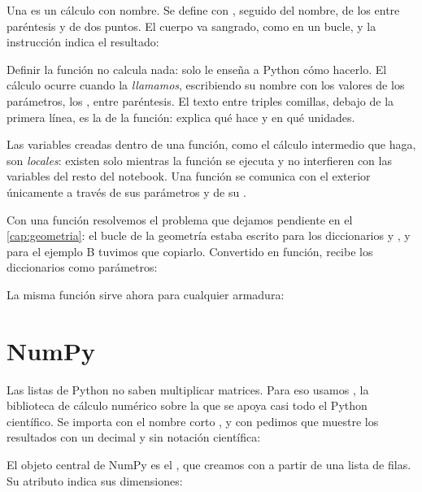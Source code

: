 Una  es un cálculo con nombre. Se define con
, seguido del nombre, de los  entre
paréntesis y de dos puntos. El cuerpo va sangrado, como en un bucle, y la
instrucción  indica el resultado:

Definir la función no calcula nada: solo le enseña a Python cómo hacerlo. El
cálculo ocurre cuando la \emph{llamamos}, escribiendo su nombre con los
valores de los parámetros, los , entre
paréntesis. El texto entre triples comillas, debajo de la primera línea, es
la  de la función: explica qué hace y en
qué unidades.

\begin{python}
Las variables creadas dentro de una función, como el cálculo intermedio que
haga, son \emph{locales}: existen solo mientras la función se ejecuta y no
interfieren con las variables del resto del notebook. Una función se comunica
con el exterior únicamente a través de sus parámetros y de su .
\end{python}

Con una función resolvemos el problema que dejamos pendiente en el
\cref{cap:geometria}: el bucle de la geometría estaba escrito para los
diccionarios  y , y para el ejemplo B tuvimos que
copiarlo. Convertido en función, recibe los diccionarios como parámetros:

La misma función sirve ahora para cualquier armadura:

\section{NumPy}\label{sec:numpy}

Las listas de Python no saben multiplicar matrices. Para eso usamos
, la biblioteca de cálculo numérico sobre la que se apoya
casi todo el Python científico. Se importa con el nombre corto , y
con  pedimos que muestre los resultados con un
decimal y sin notación científica:

El objeto central de NumPy es el , que creamos con
 a partir de una lista de filas. Su atributo  indica
sus dimensiones:

